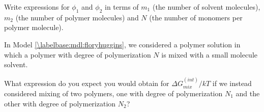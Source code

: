 \begin{activity}
\begin{exercises}
		Write expressions for $\phi_1$ and $\phi_2$ in terms of $m_1$ (the number of solvent molecules), $m_2$ (the number of polymer molecules) and $N$ (the number of monomers per polymer molecule).
				
					\begin{solution}\end{solution}
			
		\exercise In Model \ref{\labelbase:mdl:floryhuggins}, we considered a polymer solution in which a polymer with degree of polymerization $N$ is mixed with a small molecule solvent.
		
			What expression do you expect you would obtain for $\Delta G_{mix}^{(int)}/kT$ if we instead considered mixing of two polymers, one with degree of polymerization $N_1$ and the other with degree of polymerization $N_2$?
				
					\begin{solution}\end{solution}
					
\end{exercises}
	
\end{activity}